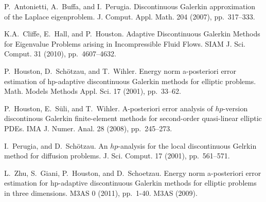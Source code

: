 
\begin{thebibliography}{10}
{\sc P.~Antonietti, A.~Buffa, and I.~Perugia}. {Discontinuous Galerkin approximation of the Laplace eigenproblem}. J. Comput. Appl. Math. 204 (2007), pp.~317--333. 

{\sc K.A.~Cliffe, E.~Hall, and P.~Houston}. {Adaptive Discontinuous {G}alerkin Methods for Eigenvalue Problems arising in Incompressible Fluid Flows}. SIAM J. Sci. Comput. 31 (2010), pp.~4607--4632.

{\sc P.~Houston, D.~Sch\"{o}tzau, and T.~Wihler}. {Energy norm a-posteriori error estimation of hp-adaptive discontinuous Galerkin methods for elliptic problems}. Math. Models Methods Appl. Sci. 17 (2001), pp.~33--62.

{\sc P.~Houston, E.~S\"{u}li, and T.~Wihler}. {A-posteriori error analysis of $hp$-version discontinous {G}alerkin finite-element methods for second-order quasi-linear elliptic {PDEs}}.
IMA J. Numer. Anal. 28 (2008), pp.~245--273. 

{\sc I.~Perugia, and D.~Sch\"{o}tzau}. {An $hp$-analysis for the local discontinuous Gelrkin method for diffusion problems}. J. Sci. Comput. 17 (2001), pp.~561--571.

{\sc L.~Zhu, S.~Giani, P.~Houston, and D.~Schoetzau}. {Energy norm a-posteriori error estimation for hp-adaptive discontinuous Galerkin methods for elliptic problems in three dimensions}. M3AS 0 (2011), pp.~1-40.
M3AS  (2009). 
\end{thebibliography}